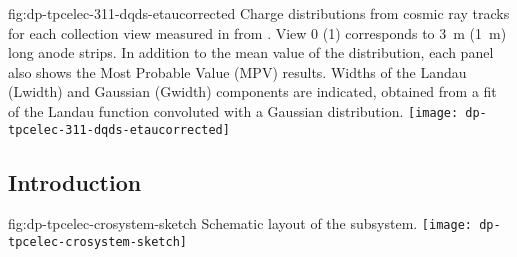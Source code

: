 \begin{dunefigure}{fig:dp-tpcelec-311-dqds-etaucorrected}
{Charge distributions from cosmic ray tracks for each collection view measured in   from \cite{Aimard:2018yxp}. View \num{0} (\num{1}) corresponds to \SI{3}{\meter} (\SI{1}{\meter}) long anode strips. In addition to the mean value of the distribution, each panel also shows the %
Most Probable Value (MPV) results. Widths of the Landau (Lwidth) and Gaussian (Gwidth) components are indicated, obtained from a fit of the Landau function convoluted with a Gaussian distribution.}
\texttt{[image: dp-tpcelec-311-dqds-etaucorrected]}
\end{dunefigure}

\begin{comment}  Anne's not sure this is needed.
This chapter is organized as follows. In this section we provide an overview of the \dword{dp} \dword{tpc} electronics system and discuss design considerations. In Section~\ref{sec:dp-tpcelec-design}, we give detailed descriptions of the principal components. This is followed by the discussion of the production scheme, quality assurance and control, and calibration program in Section~\ref{sec:dp-tpcelec-production}. Section~\ref{sec:dp-tpcelec-transport} briefly covers the transportation and handling, while Section~\ref{sec:dp-tpcelec-intfc} describes interfaces to other detector systems. Details on the installation, integration, and commissioning of the \dword{dp} \dword{tpc} electronics system underground are provided in Section~\ref{sec:dp-tpcelec-install}. Sections~\ref{sec:dp-tpcelec-risks} and~\ref{sec:dp-tpcelec-safety} address risks and safety, respectively. Section~\ref{sec:dp-tpcelec-org} presents the organizational structure of the \dword{dp} \dword{tpc} electronics consortium, discusses schedule, and provides the estimates of the core costs. 
\end{comment}

\subsection{Introduction}
\label{ssec:dp-tpcelec-intro}

\begin{dunefigure}{fig:dp-tpcelec-crosystem-sketch}
{Schematic layout of the   subsystem.}
\texttt{[image: dp-tpcelec-crosystem-sketch]}
\end{dunefigure}

